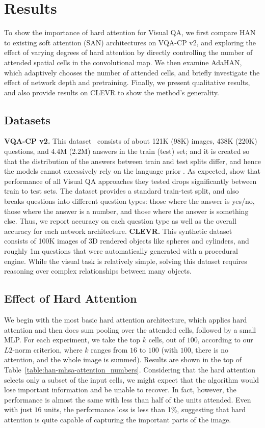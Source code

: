 \section{Results}
\label{sec:results}
To show the importance of hard attention for Visual QA, we first compare HAN to existing soft attention (SAN) architectures on VQA-CP v2, and exploring the effect of varying degrees of hard attention by directly controlling the number of attended spatial cells in the convolutional map. 
We then examine AdaHAN, which adaptively chooses the number of attended cells, and briefly investigate the effect of network depth and pretraining.
Finally, we present qualitative results, and also provide results on CLEVR to show the method's generality.

\subsection{Datasets}
\textbf{VQA-CP v2.} This dataset~\cite{agrawal2017don}
consists of about 121K (98K) images, 438K (220K) questions, and 4.4M (2.2M) answers in the train (test) set; and it is created so that the distribution of the answers between train and test splits differ, and hence the models cannot excessively rely on the language prior \cite{agrawal2017don}. As expected, \cite{agrawal2017don} show that performance of all Visual QA approaches they tested drops significantly between train to test sets. 
The dataset provides a standard train-test split, and also breaks questions into different question types: those where the answer is yes/no, those where the answer is a number, and those where the answer is something else. Thus, we report accuracy on each question type as well as the overall accuracy for each network architecture.
\newline
\textbf{CLEVR.} This synthetic dataset~\cite{johnson2017clevr} consists of 100K images of 3D rendered objects like spheres and cylinders, and roughly 1m questions that were automatically generated with a procedural engine.  While the visual task is relatively simple, solving this dataset requires reasoning over complex relationships between many objects.

\subsection{Effect of Hard Attention}
We begin with the most basic hard attention architecture, which applies hard attention and then does sum pooling over the attended cells, followed by a small MLP.
For each experiment, we take the top $k$ cells, out of $100$, according to our $L2$-norm criterion, where $k$ ranges from $16$ to $100$ (with $100$, there is no attention, and the whole image is summed).  
Results are shown in the top of Table~\ref{table:han-mhsa-attention_numbers}.  
Considering that the hard attention 
selects only a subset of the input cells, 
we might expect that the algorithm would lose important information and be unable to recover.
In fact, however, the performance is almost the same with less than half of the units attended.
Even with just $16$ units, the performance loss is less than 1\%, suggesting that hard attention is quite capable of capturing the important parts of the image. 


